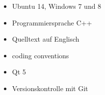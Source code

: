 \begin{itemize}
\item Ubuntu 14, Windows 7 und 8
\item Programmiersprache C++
\item Quelltext auf Englisch
\item coding conventions
\item Qt 5
\item Versionskontrolle mit Git
\end{itemize}